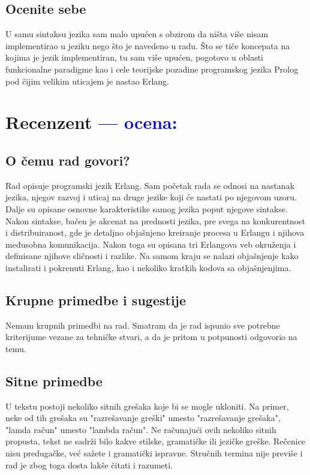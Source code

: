 \documentclass[a4paper]{report}
\newcommand{\odgovor}[1]{\textcolor{blue}{#1}}
\begin{document}
\section{Ocenite sebe}
U samu sintaksu jezika sam malo upućen s obzirom da ništa više nisam implementirao u jeziku nego što je navedeno u radu.
Što se tiče koncepata na kojima je jezik implementiran, tu sam više upućen, pogotovo u oblasti funkcionalne paradigme kao i cele teorijske pozadine programskog jezika Prolog pod čijim velikim  uticajem je nastao Erlang.

\chapter{Recenzent \odgovor{--- ocena:} }


\section{O čemu rad govori?}
Rad opisuje programski jezik Erlang. Sam početak rada se odnosi na nastanak jezika, njegov razvoj i uticaj na druge jezike koji će nastati po njegovom uzoru. Dalje su opisane osnovne karakteristike samog jezika poput njegove sintakse. Nakon sintakse, bačen je akcenat na prednosti jezika, pre svega na konkurentnost i distribuiranost, gde je detaljno objašnjeno kreiranje procesa u Erlangu i njihova međusobna komunikacija. Nakon toga su opisana tri Erlangova veb okruženja i definisane njihove sličnosti i razlike. Na samom kraju se nalazi objašnjenje kako instalirati i pokrenuti Erlang, kao i nekoliko kratkih kodova sa objašnjenjima.
    
    
\section{Krupne primedbe i sugestije}
Nemam krupnih primedbi na rad. Smatram da je rad ispunio sve potrebne kriterijume vezane za tehničke stvari, a da je pritom  u potpunosti odgovorio na temu.


\section{Sitne primedbe}
U tekstu postoji nekoliko sitnih grešaka koje bi se mogle ukloniti. Na primer, neke od tih grešaka su "razrešavanje greški"   umesto "razrešavanje grešaka", "lamda račun" umesto "lambda račun". Ne računajući ovih nekoliko sitnih propusta, tekst ne sadrži bilo kakve stilske, gramatičke ili jezičke greške. Rečenice nisu predugačke, već sažete i gramatički ispravne. Stručnih termina nije previše i rad je zbog toga dosta lakše čitati i razumeti.
\end{document}
